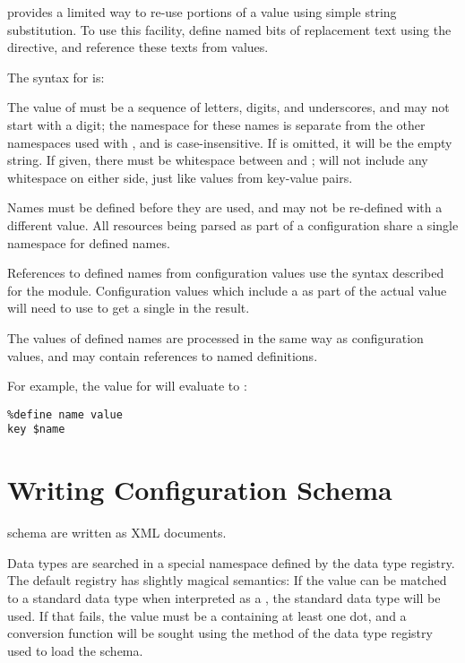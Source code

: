 \documentclass{howto}
\newcommand{\datatype}[1]{\strong{#1}}
\begin{document}
 provides a limited way to re-use portions of a value
using simple string substitution.  To use this facility, define named
bits of replacement text using the  directive, and
reference these texts from values.

The syntax for  is:

\begin{alltt}
%define \var{name} \optional{\var{value}}
\end{alltt}

The value of  must be a sequence of letters, digits, and
underscores, and may not start with a digit; the namespace for these
names is separate from the other namespaces used with
, and is case-insensitive.  If  is
omitted, it will be the empty string.  If given, there must be
whitespace between  and ;  will not
include any whitespace on either side, just like values from key-value
pairs.

Names must be defined before they are used, and may not be
re-defined with a different value.  All resources being parsed as part of
a configuration share a single namespace for defined names.

References to defined names from configuration values use the syntax
described for the  module.
Configuration values which include a \character{\$} as part of the
actual value will need to use \code{\$\$} to get a single
\character{\$} in the result.

The values of defined names are processed in the same way as
configuration values, and may contain references to named
definitions.

For example, the value for  will evaluate to :

\begin{verbatim}
%define name value
key $name
\end{verbatim} %


\section{Writing Configuration Schema \label{writing-schema}}

 schema are written as XML documents.

Data types are searched in a special namespace defined by the data
type registry.  The default registry has slightly magical semantics:
If the value can be matched to a standard data type when interpreted
as a \datatype{basic-key}, the standard data type will be used.  If
that fails, the value must be a \datatype{dotted-name} containing at
least one dot, and a conversion function will be sought using the
 method of the data type registry used to load the
schema.
\end{document}
